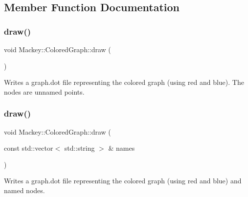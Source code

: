 \subsection{Member Function Documentation}
\mbox{\label{classMackey_1_1ColoredGraph_a8ed05073805b34a0087a7ed94e889694}} 
\subsubsection{\texorpdfstring{draw()}{draw()}\hspace{0.1cm}{\footnotesize\ttfamily [1/3]}}
{\footnotesize\ttfamily void Mackey\+::\+Colored\+Graph\+::draw (\begin{DoxyParamCaption}{ }\end{DoxyParamCaption})}



Writes a graph.\+dot file representing the colored graph (using red and blue). The nodes are unnamed points. 

\mbox{\label{classMackey_1_1ColoredGraph_a912a6e5cb94386d9ff6510e968b41e7d}} 
\subsubsection{\texorpdfstring{draw()}{draw()}\hspace{0.1cm}{\footnotesize\ttfamily [2/3]}}
{\footnotesize\ttfamily void Mackey\+::\+Colored\+Graph\+::draw (\begin{DoxyParamCaption}\item[{const std\+::vector$<$ std\+::string $>$ \&}]{names }\end{DoxyParamCaption})}



Writes a graph.\+dot file representing the colored graph (using red and blue) and named nodes. 

\mbox{\label{classMackey_1_1ColoredGraph_a88cde9e3cc3bfb72409142ac6705b474}} 
